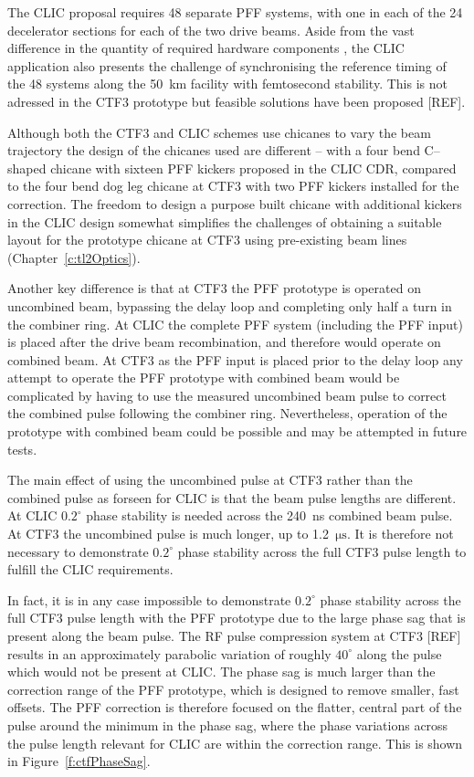 The CLIC proposal requires 48 separate PFF systems, with one in each of the 24 decelerator sections for each of the two drive beams. Aside from the vast difference in the quantity of required hardware components , the CLIC application also presents the challenge of synchronising the reference timing of the 48 systems along the 50~km facility with femtosecond stability. This is not adressed in the CTF3 prototype but feasible solutions have been proposed [REF].

Although both the CTF3 and CLIC schemes use chicanes to vary the beam trajectory the design of the chicanes used are different -- with a four bend C--shaped chicane with sixteen PFF kickers proposed in the CLIC CDR, compared to the four bend dog leg chicane at CTF3 with two PFF kickers installed for the correction. The freedom to design a purpose built chicane with additional kickers in the CLIC design somewhat simplifies the challenges of obtaining a suitable layout for the prototype chicane at CTF3 using pre-existing beam lines (Chapter~\ref{c:tl2Optics}).

Another key difference is that at CTF3 the PFF prototype is operated on uncombined beam, bypassing the delay loop and completing only half a turn in the combiner ring. At CLIC the complete PFF system (including the PFF input) is placed after the drive beam recombination, and therefore would operate on combined beam. At CTF3 as the PFF input is placed prior to the delay loop any attempt to operate the PFF prototype with combined beam would be complicated by having to use the measured uncombined beam pulse to correct the combined pulse following the combiner ring. Nevertheless, operation of the prototype with combined beam could be possible and may be attempted in future tests.

The main effect of using the uncombined pulse at CTF3 rather than the combined pulse as forseen for CLIC is that the beam pulse lengths are different. At CLIC \(0.2^\circ\) phase stability is needed across the 240~ns combined beam pulse. At CTF3 the uncombined pulse is much longer, up to 1.2~\(\mathrm{\mu s}\). It is therefore not necessary to demonstrate \(0.2^\circ\) phase stability across the full CTF3 pulse length to fulfill the CLIC requirements.

In fact, it is in any case impossible to demonstrate \(0.2^\circ\) phase stability across the full CTF3 pulse length with the PFF prototype due to the large phase sag that is present along the beam pulse. The RF pulse compression system at CTF3 [REF] results in an approximately parabolic variation of roughly \(40^\circ\) along the pulse which would not be present at CLIC. The phase sag is much larger than the correction range of the PFF prototype, which is designed to remove smaller, fast offsets. The PFF correction is therefore focused on the flatter, central part of the pulse around the minimum in the phase sag, where the phase variations across the pulse length relevant for CLIC are within the correction range. This is shown in Figure~\ref{f:ctfPhaseSag}.

